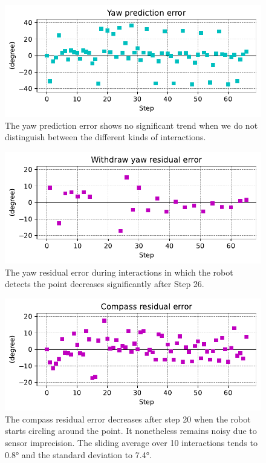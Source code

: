 \documentclass[runningheads]{llncs}
\begin{document}
\begin{figure}
	\includegraphics[width=\textwidth]{02_yaw_pe.pdf}
	\caption{The yaw prediction error shows no significant trend when we do not distinguish between the different kinds of interactions.} \label{fig:yaw_pe}
\end{figure}

\begin{figure}
	\includegraphics[width=\textwidth]{03_yaw_re.pdf}
	\caption{The yaw residual error during interactions in which the robot detects the point decreases significantly after Step 26.} \label{fig:yaw_re}
\end{figure}

\begin{figure}
	\includegraphics[width=\textwidth]{04_Compass.pdf}
	\caption{The compass residual error decreases after step 20 when the robot starts circling around the point.
	It nonetheless remains noisy due to sensor imprecision.
	The sliding average over 10 interactions tends to 0.8° and the standard deviation to 7.4°.} \label{fig:compass}
\end{figure}
\end{document}
